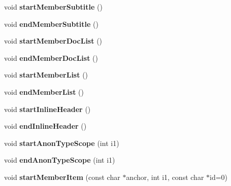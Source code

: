 \begin{DoxyCompactItemize}
\item 
\hypertarget{class_output_list_a7cf4dbf258928f842c9e96807345bc7a}{void {\bfseries start\-Member\-Subtitle} ()}\label{class_output_list_a7cf4dbf258928f842c9e96807345bc7a}

\item 
\hypertarget{class_output_list_a8073c2e7983bc4cd328e4229f51f3bbf}{void {\bfseries end\-Member\-Subtitle} ()}\label{class_output_list_a8073c2e7983bc4cd328e4229f51f3bbf}

\item 
\hypertarget{class_output_list_a45f1ccc157c1f0a3797f633881b4945e}{void {\bfseries start\-Member\-Doc\-List} ()}\label{class_output_list_a45f1ccc157c1f0a3797f633881b4945e}

\item 
\hypertarget{class_output_list_a1c5248e846cc6987215cd7ae768f7f7c}{void {\bfseries end\-Member\-Doc\-List} ()}\label{class_output_list_a1c5248e846cc6987215cd7ae768f7f7c}

\item 
\hypertarget{class_output_list_a951526ac3cd02dd43391d611259ec6ab}{void {\bfseries start\-Member\-List} ()}\label{class_output_list_a951526ac3cd02dd43391d611259ec6ab}

\item 
\hypertarget{class_output_list_a71bf3ec847372dc87b57e6fbbdf012ea}{void {\bfseries end\-Member\-List} ()}\label{class_output_list_a71bf3ec847372dc87b57e6fbbdf012ea}

\item 
\hypertarget{class_output_list_a427e41a09413570a1c7abf7ee6666385}{void {\bfseries start\-Inline\-Header} ()}\label{class_output_list_a427e41a09413570a1c7abf7ee6666385}

\item 
\hypertarget{class_output_list_a0d624d7b38eb45de11d16e311a2cc75b}{void {\bfseries end\-Inline\-Header} ()}\label{class_output_list_a0d624d7b38eb45de11d16e311a2cc75b}

\item 
\hypertarget{class_output_list_aa918ceb52929e7004152c28541bddf30}{void {\bfseries start\-Anon\-Type\-Scope} (int i1)}\label{class_output_list_aa918ceb52929e7004152c28541bddf30}

\item 
\hypertarget{class_output_list_abc69932b9f8bfefde63c20cbaa959ff5}{void {\bfseries end\-Anon\-Type\-Scope} (int i1)}\label{class_output_list_abc69932b9f8bfefde63c20cbaa959ff5}

\item 
\hypertarget{class_output_list_a93880b73d428345edb028629b084253e}{void {\bfseries start\-Member\-Item} (const char $\ast$anchor, int i1, const char $\ast$id=0)}\label{class_output_list_a93880b73d428345edb028629b084253e}


\end{DoxyCompactItemize}
